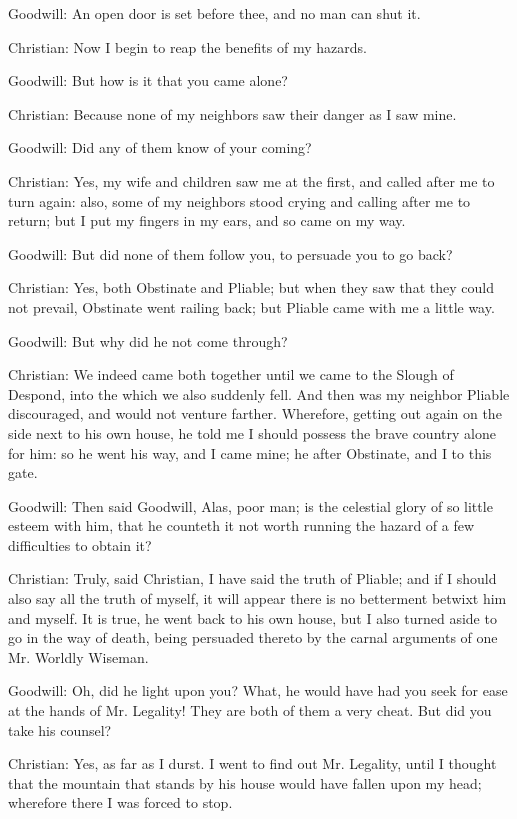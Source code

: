 Goodwill: An open door is set before thee, and no man can shut it.

Christian: Now I begin to reap the benefits of my hazards.

Goodwill: But how is it that you came alone?

Christian: Because none of my neighbors saw their danger as I saw mine.

Goodwill: Did any of them know of your coming?

Christian: Yes, my wife and children saw me at the first, and called after me to turn again: also, some of my neighbors stood crying and calling after me to return; but I put my fingers in my ears, and so came on my way.

Goodwill: But did none of them follow you, to persuade you to go back?

Christian: Yes, both Obstinate and Pliable; but when they saw that they could not prevail, Obstinate went railing back; but Pliable came with me a little way.

Goodwill: But why did he not come through?

Christian: We indeed came both together until we came to the Slough of Despond, into the which we also suddenly fell. And then was my neighbor Pliable discouraged, and would not venture farther. Wherefore, getting out again on the side next to his own house, he told me I should possess the brave country alone for him: so he went his way, and I came mine; he after Obstinate, and I to this gate.

Goodwill: Then said Goodwill, Alas, poor man; is the celestial glory of so little esteem with him, that he counteth it not worth running the hazard of a few difficulties to obtain it?

Christian: Truly, said Christian, I have said the truth of Pliable; and if I should also say all the truth of myself, it will appear there is no betterment betwixt him and myself. It is true, he went back to his own house, but I also turned aside to go in the way of death, being persuaded thereto by the carnal arguments of one Mr. Worldly Wiseman.

Goodwill: Oh, did he light upon you? What, he would have had you seek for ease at the hands of Mr. Legality! They are both of them a very cheat. But did you take his counsel?

Christian: Yes, as far as I durst. I went to find out Mr. Legality, until I thought that the mountain that stands by his house would have fallen upon my head; wherefore there I was forced to stop.

